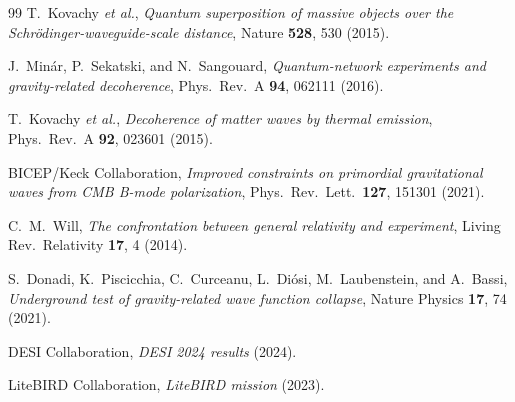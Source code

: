 \documentclass[11pt,a4paper]{article}
\begin{document}
\begin{thebibliography}{99}
T.~Kovachy \emph{et al.},
\emph{Quantum superposition of massive objects over the
Schr\"odinger-waveguide-scale distance},
Nature \textbf{528}, 530 (2015).

J.~Min\'ar, P.~Sekatski, and N.~Sangouard,
\emph{Quantum-network experiments and gravity-related decoherence},
Phys.\ Rev.\ A \textbf{94}, 062111 (2016).

T.~Kovachy \emph{et al.},
\emph{Decoherence of matter waves by thermal emission},
Phys.\ Rev.\ A \textbf{92}, 023601 (2015).

BICEP/Keck Collaboration,
\emph{Improved constraints on primordial gravitational waves from
CMB B-mode polarization},
Phys.\ Rev.\ Lett.\ \textbf{127}, 151301 (2021).

C.~M.~Will,
\emph{The confrontation between general relativity and experiment},
Living Rev.\ Relativity \textbf{17}, 4 (2014).

S.~Donadi, K.~Piscicchia, C.~Curceanu, L.~Di\'osi,
M.~Laubenstein, and A.~Bassi,
\emph{Underground test of gravity-related wave function collapse},
Nature Physics \textbf{17}, 74 (2021).

DESI Collaboration, \emph{DESI 2024 results} (2024).

LiteBIRD Collaboration, \emph{LiteBIRD mission} (2023).

\end{thebibliography}
\end{document}
